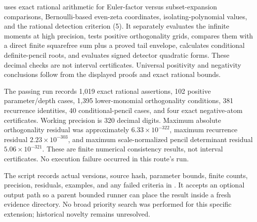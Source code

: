 uses exact rational arithmetic
for Euler-factor versus subset-expansion comparisons, Bernoulli-based
even-zeta coordinates, isolating-polynomial values, and the rational
detection criterion (5). It separately evaluates the infinite moments at
high precision, tests positive orthogonality grids, compares them with a
direct finite squarefree sum plus a proved tail envelope, calculates
conditional definite-pencil roots, and evaluates signed detector quadratic forms.
These decimal checks are not interval certificates. Universal positivity
and negativity conclusions follow from the displayed proofs and exact
rational bounds.

The passing run records 1,019 exact rational assertions, 102 positive
parameter/depth cases, 1,395 lower-monomial orthogonality conditions,
381 recurrence identities, 40 conditional-pencil cases, and four exact
negative-atom certificates. Working precision is 320 decimal digits.
Maximum absolute orthogonality residual was approximately
\(6.33\times10^{-322}\), maximum recurrence residual
\(2.23\times10^{-303}\), and maximum scale-normalized pencil determinant
residual \(5.06\times10^{-321}\). These are finite numerical consistency
results, not interval certificates. No execution failure occurred in
this route's run.

The script records actual versions, source hash, parameter bounds,
finite counts, precision, residuals, examples, and any failed criteria
in . It accepts an
optional output path so a parent bounded runner can place the result
inside a fresh evidence directory. No broad priority search was
performed for this specific extension; historical novelty remains
unresolved.
